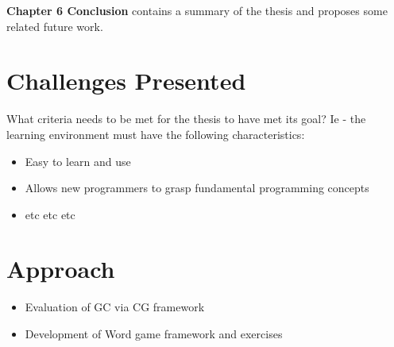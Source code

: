 
\textbf{Chapter 6 Conclusion} contains a summary of the thesis and proposes some related future work.

\section{Challenges Presented}

What criteria needs to be met for the thesis to have met its goal?  Ie - the learning environment must have the following characteristics:

\begin{itemize}
	\item Easy to learn and use
	\item Allows new programmers to grasp fundamental programming concepts
	\item etc etc etc
\end{itemize}

\section{Approach}

\begin{itemize}
	\item Evaluation of GC via CG framework
	\item Development of Word game framework and exercises
\end{itemize}


\begin{comment}
Why is this thesis useful?

Programming is hard, students new to programming often struggle to cope with the complexities of software development.

Declining enrollment, syntax errors discourage students early and thus they leave computer science before they've
gotten anywhere in the discipline...

It has been theorized that visual programming environments (VPE's) help to alleviate some of the early frustrations
associated with learning to program.  Many examples include Alice, Scratch, FIXME more...., however, very few have
been proposed that fall into the functional programming paradigm.  Why FP?
\end{comment}